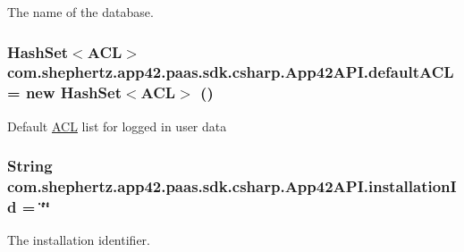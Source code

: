 The name of the database. 

\hypertarget{classcom_1_1shephertz_1_1app42_1_1paas_1_1sdk_1_1csharp_1_1_app42_a_p_i_a8ccfacd2b83f6020e0bfda37a46c8bfd}{
\subsubsection[{default\+A\+C\+L}]{\setlength{\rightskip}{0pt plus 5cm}Hash\+Set$<${\bf A\+C\+L}$>$ com.\+shephertz.\+app42.\+paas.\+sdk.\+csharp.\+App42\+A\+P\+I.\+default\+A\+C\+L = new Hash\+Set$<${\bf A\+C\+L}$>$ ()\hspace{0.3cm}{\ttfamily [static]}}}\label{classcom_1_1shephertz_1_1app42_1_1paas_1_1sdk_1_1csharp_1_1_app42_a_p_i_a8ccfacd2b83f6020e0bfda37a46c8bfd}


Default \hyperlink{classcom_1_1shephertz_1_1app42_1_1paas_1_1sdk_1_1csharp_1_1_a_c_l}{A\+C\+L} list for logged in user data 

\hypertarget{classcom_1_1shephertz_1_1app42_1_1paas_1_1sdk_1_1csharp_1_1_app42_a_p_i_a6f0e5b52addd4183ef36df05ce7b7c9a}{
\subsubsection[{installation\+Id}]{\setlength{\rightskip}{0pt plus 5cm}String com.\+shephertz.\+app42.\+paas.\+sdk.\+csharp.\+App42\+A\+P\+I.\+installation\+Id = \char`\"{}\char`\"{}\hspace{0.3cm}{\ttfamily [static]}}}\label{classcom_1_1shephertz_1_1app42_1_1paas_1_1sdk_1_1csharp_1_1_app42_a_p_i_a6f0e5b52addd4183ef36df05ce7b7c9a}


The installation identifier. 

